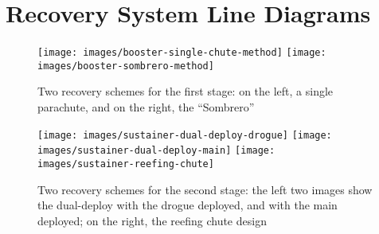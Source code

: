 \section{Recovery System Line Diagrams} \label{section:line-dia-appendix}

\begin{figure}[htbp]
    \centering
    \texttt{[image: images/booster-single-chute-method]}
    \hspace{2cm}
    \texttt{[image: images/booster-sombrero-method]}
    \caption{Two recovery schemes for the first stage: on the left, a single parachute, and on the right, the ``Sombrero''}
    \label{figure:line-dia-booster}
\end{figure}

\begin{figure}[htbp]
    \centering
    \texttt{[image: images/sustainer-dual-deploy-drogue]}
    \hspace{1cm}
    \texttt{[image: images/sustainer-dual-deploy-main]}
    \hspace{1cm}
    \texttt{[image: images/sustainer-reefing-chute]}
    \caption{Two recovery schemes for the second stage: the left two images show the dual-deploy with the drogue deployed, and with the main deployed; on the right, the reefing chute design}
    \label{figure:line-dia-sustainer}
\end{figure}

\pagebreak